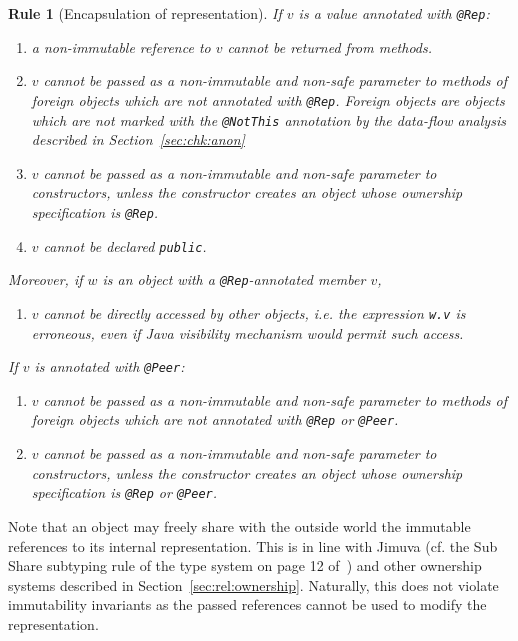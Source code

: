 \documentclass{pracamgr}
\theoremstyle{break}
\theoremstyle{break}
\theoremstyle{break}
\newtheorem{verrule}{Rule}
\begin{document}
\begin{verrule}[Encapsulation of representation]
  If $v$ is a value annotated with \texttt{@Rep}:
  \begin{enumerate}[label=(\arabic*)]
  \item a non-immutable reference to $v$ cannot be returned from
    methods.
  \item $v$ cannot be passed as a non-immutable and non-safe parameter
    to methods of foreign objects which are not annotated with
    \texttt{@Rep}. Foreign objects are objects which are not marked
    with the \texttt{@NotThis} annotation by the data-flow analysis
    described in Section~\ref{sec:chk:anon}
  \item $v$ cannot be passed as a non-immutable and non-safe parameter
    to constructors, unless the constructor creates an object whose
    ownership specification is \texttt{@Rep}.
  \item $v$ cannot be declared \texttt{public}. 
  \end{enumerate}
  Moreover, if $w$ is an object with a \texttt{@Rep}-annotated member
  $v$,
  \begin{enumerate}[label=(\arabic*), resume]
  \item $v$ cannot be directly accessed by other objects, i.e. the
    expression \texttt{w.v} is erroneous, even if Java visibility
    mechanism would permit such access.
  \end{enumerate}
  If $v$ is annotated with \texttt{@Peer}:
  \begin{enumerate}[label=(\arabic*), resume]
  \item $v$ cannot be passed as a non-immutable and non-safe parameter
    to methods of foreign objects which are not annotated with
    \texttt{@Rep} or \texttt{@Peer}.
  \item $v$ cannot be passed as a non-immutable and non-safe parameter
    to constructors, unless the constructor creates an object whose
    ownership specification is \texttt{@Rep} or \texttt{@Peer}.
  \end{enumerate}
\end{verrule}

Note that an object may freely share with the outside world the
immutable references to its internal representation. This is in line
with Jimuva (cf. the Sub Share subtyping rule of the type system on
page 12 of~\cite{haack}) and other ownership systems described in
Section~\ref{sec:rel:ownership}. Naturally, this does not violate
immutability invariants as the passed references cannot be used to
modify the representation. 
\end{document}
